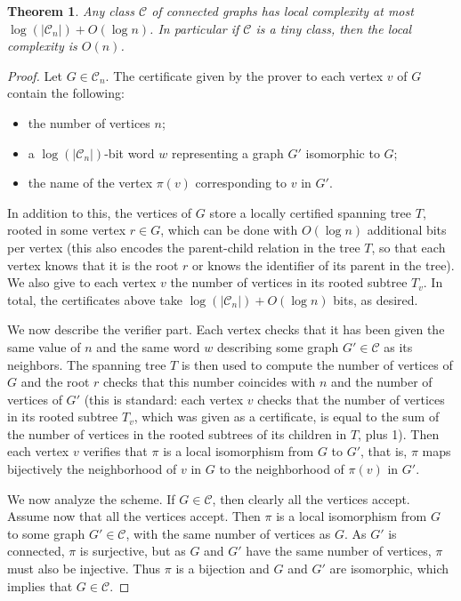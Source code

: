 \documentclass[10pt,a4paper]{amsart}
\newtheorem{theorem}{Theorem}
\begin{document}
\begin{theorem}
  Any class $\mathcal{C}$ of connected graphs has local complexity at most
$\log(|\mathcal{C}_n|)+O(\log n)$. In particular if  $\mathcal{C}$ is
a tiny class, then the local complexity is $O(n)$.
\end{theorem}

\begin{proof}
Let $G\in \mathcal{C}_n$. The certificate given by the prover to
each vertex $v$ of $G$ contain the following:

\begin{itemize}
\item the number of vertices $n$;
\item a $\log(|\mathcal{C}_n|)$-bit word $w$ representing a graph $G'$ isomorphic to $G$;
\item the name of the vertex $\pi(v)$ corresponding to $v$ in $G'$.
\end{itemize}
In addition to this, the vertices of $G$ store a locally certified spanning
tree $T$, rooted in some vertex $r\in G$, which can be done with
$O(\log n)$ additional bits per vertex (this also encodes the
parent-child relation in the tree $T$, so that each vertex knows that
it is the root $r$ or knows the identifier of its parent in the
tree). We also give to each vertex $v$ the number of vertices in its
rooted subtree $T_v$.
In total, the certificates
above take $\log(|\mathcal{C}_n|)+O(\log n)$ bits, as desired.

\medskip

We now describe the verifier part. Each
vertex checks that it has been given the same value of $n$ and the same
word $w$ describing some graph $G'\in \mathcal{C}$ as its neighbors. The spanning tree $T$ is
then used to compute the number of vertices of $G$ and the root $r$
checks that this number coincides with $n$ and the number of vertices
of $G'$ (this is standard: each
vertex $v$ checks that the number of vertices in its rooted subtree
$T_v$, which was given as a certificate, is equal to the sum of the
number of vertices in the rooted subtrees of its children in $T$, plus
1).
Then each vertex $v$
verifies that $\pi$ is a local isomorphism from $G$ to $G'$, that is,
$\pi$ maps bijectively the neighborhood of $v$ in $G$ to the neighborhood of
$\pi(v)$ in $G'$.

\medskip

We now analyze the scheme. If $G\in \mathcal{C}$, then clearly all the
vertices accept. Assume now that all the vertices accept. Then $\pi$
is a local isomorphism from $G$ to some graph $G'\in \mathcal{C}$,
with the same number of vertices as $G$. As $G'$ is connected, $\pi$
is surjective, but as $G$
and $G'$ have the same number of vertices, $\pi$ must also be
injective. Thus $\pi$ is a bijection and $G$ and $G'$ are isomorphic,
which implies that $G\in \mathcal{C}$.
\end{proof}
\end{document}
